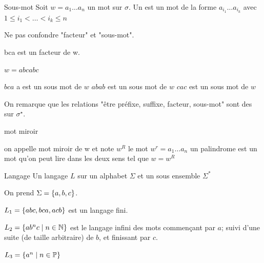     \begin{definition}{Sous-mot}{}
        Soit $w=a_1 \dots a_n$ un mot sur $\sigma$.
        Un  est un mot de la forme $a_{i_1} \dots a_{i_k}$ avec $1 \leq i_1 < \dots < i_k \leq n$
        
    \end{definition}
    
    \begin{warning}{}{}
        Ne pas confondre "facteur" et "sous-mot".
        \begin{enumerate}
            \itt bca est un facteur de w.
        \end{enumerate}
    \end{warning}
    
    \begin{example}{}{}
        $w=abcabc$
        \begin{enumerate}
            \itt $bca$ a est un sous mot de $w$
            \itt $abab$ est un sous mot de $w$
            \itt $cac$ est un sous mot de $w$
            
            
        \end{enumerate}
        
        On remarque que les relations "être préfixe, suffixe, facteur, sous-mot" sont des  sur $\sigma^\star$.
        
    \end{example}
    \begin{definition}{mot miroir}{}
        \begin{enumerate}
            \itt on appelle mot miroir de w et note $w^R$
        le mot $w^r =  a_1 \dots a_n$
            \itt un palindrome est un mot qu'on peut lire dans les deux sens tel que $w=w^R$
            
            
            
        \end{enumerate}
        
    \end{definition}
    
    \begin{definition}{Langage}{}
        Un langage $L$ sur un alphabet $\Sigma$ et un sous ensemble $\Sigma^*$ 
    \end{definition}
    
    \begin{example}{}{}
        On prend $\Sigma = \left\{a, b, c\right\}$.
        \begin{enumerate}
            \itt $L_1 = \left\{abc, bca, acb\right\}$ est un langage fini.
            
            \itt $L_2 = \left\{ab^nc \;\middle\vert\; n \in \mathbb{N}\right\}$ est le langage infini des mots commençant par $a$; suivi d'une suite (de taille arbitraire) de $b$, et finissant par $c$.
            
            \itt $L_3 = \left\{a^n \;\middle\vert\; n \in \mathbb{P}\right\}$
        \end{enumerate}
    \end{example}
    
